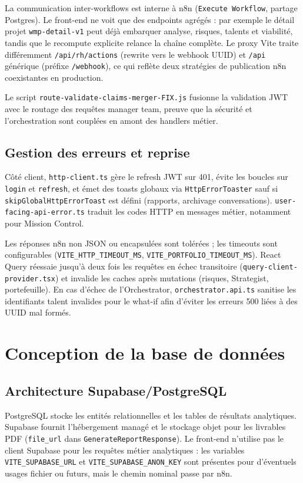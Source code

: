La communication inter-workflows est interne à n8n (\texttt{Execute Workflow}, partage Postgres). Le front-end ne voit que des endpoints agrégés : par exemple le détail projet \texttt{wmp-detail-v1} peut déjà embarquer analyse, risques, talents et viabilité, tandis que le recompute explicite relance la chaîne complète. Le proxy Vite traite différemment \texttt{/api/rh/actions} (rewrite vers le webhook UUID) et \texttt{/api} générique (préfixe \texttt{/webhook}), ce qui reflète deux stratégies de publication n8n coexistantes en production.

Le script \texttt{route-validate-claims-merger-FIX.js} fusionne la validation JWT avec le routage des requêtes manager team, preuve que la sécurité et l'orchestration sont couplées en amont des handlers métier.

\subsection{Gestion des erreurs et reprise}

Côté client, \texttt{http-client.ts} gère le refresh JWT sur 401, évite les boucles sur \texttt{login} et \texttt{refresh}, et émet des toasts globaux via \texttt{HttpErrorToaster} sauf si \texttt{skipGlobalHttpErrorToast} est défini (rapports, archivage conversations). \texttt{user-facing-api-error.ts} traduit les codes HTTP en messages métier, notamment pour Mission Control.

Les réponses n8n non JSON ou encapsulées sont tolérées ; les timeouts sont configurables (\texttt{VITE\_HTTP\_TIMEOUT\_MS}, \texttt{VITE\_PORTFOLIO\_TIMEOUT\_MS}). React Query réessaie jusqu'à deux fois les requêtes en échec transitoire (\texttt{query-client-provider.tsx}) et invalide les caches après mutations (risques, Strategist, portefeuille). En cas d'échec de l'Orchestrator, \texttt{orchestrator.api.ts} sanitise les identifiants talent invalides pour le what-if afin d'éviter les erreurs 500 liées à des UUID mal formés.

\section{Conception de la base de données}

\subsection{Architecture Supabase/PostgreSQL}

PostgreSQL stocke les entités relationnelles et les tables de résultats analytiques. Supabase fournit l'hébergement managé et le stockage objet pour les livrables PDF (\texttt{file\_url} dans \texttt{GenerateReportResponse}). Le front-end n'utilise pas le client Supabase pour les requêtes métier analytiques : les variables \texttt{VITE\_SUPABASE\_URL} et \texttt{VITE\_SUPABASE\_ANON\_KEY} sont présentes pour d'éventuels usages fichier ou futurs, mais le chemin nominal passe par n8n.


